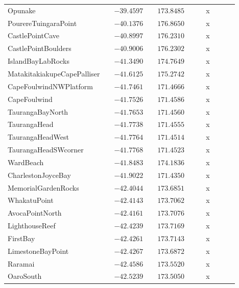 \begin{table}[!htbp]
\begin{center}
\begin{tabular}{lcrcrcllcll}
Opunake&&$-39.4597$&&$173.8485$&&&x&&&\tabularnewline
PourereTuingaraPoint&&$-40.1376$&&$176.8650$&&&x&&&\tabularnewline
CastlePointCave&&$-40.8997$&&$176.2310$&&&x&&&\tabularnewline
CastlePointBoulders&&$-40.9006$&&$176.2302$&&&x&&&\tabularnewline
IslandBayLabRocks&&$-41.3490$&&$174.7649$&&&x&&&\tabularnewline
MatakitakiakupeCapePalliser&&$-41.6125$&&$175.2742$&&&x&&&\tabularnewline
CapeFoulwindNWPlatform&&$-41.7461$&&$171.4666$&&&x&&&\tabularnewline
CapeFoulwind&&$-41.7526$&&$171.4586$&&&x&&&\tabularnewline
TaurangaBayNorth&&$-41.7653$&&$171.4560$&&&x&&&\tabularnewline
TaurangaHead&&$-41.7738$&&$171.4555$&&&x&&&\tabularnewline
TaurangaHeadWest&&$-41.7764$&&$171.4514$&&&x&&&\tabularnewline
TaurangaHeadSWcorner&&$-41.7768$&&$171.4523$&&&x&&&\tabularnewline
WardBeach&&$-41.8483$&&$174.1836$&&&x&&&\tabularnewline
CharlestonJoyceBay&&$-41.9022$&&$171.4350$&&&x&&&\tabularnewline
MemorialGardenRocks&&$-42.4044$&&$173.6851$&&&x&&&\tabularnewline
WhakatuPoint&&$-42.4143$&&$173.7062$&&&x&&&\tabularnewline
AvocaPointNorth&&$-42.4161$&&$173.7076$&&&x&&&\tabularnewline
LighthouseReef&&$-42.4239$&&$173.7169$&&&x&&&\tabularnewline
FirstBay&&$-42.4261$&&$173.7143$&&&x&&&\tabularnewline
LimestoneBayPoint&&$-42.4267$&&$173.6872$&&&x&&&\tabularnewline
Raramai&&$-42.4586$&&$173.5520$&&&x&&&\tabularnewline
OaroSouth&&$-42.5239$&&$173.5050$&&&x&&&\tabularnewline
\hline
\end{tabular}\end{center}
\end{table}
